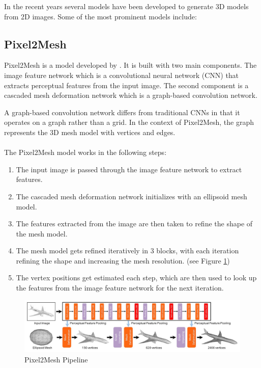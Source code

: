 In the recent years several models have been developed to generate 3D models from 2D images. Some of the most prominent models include:

\subsection{Pixel2Mesh}
Pixel2Mesh is a model developed by \textcite{wang_pixel2mesh_2018}.
It is built with two main components. The image feature network which is a convolutional neural network (CNN) that extracts perceptual features from the input image. The second component is a cascaded mesh deformation network which is a graph-based convolution network.

A graph-based convolution network differs from traditional CNNs in that it operates on a graph rather than a grid. In the context of Pixel2Mesh, the graph represents the 3D mesh model with vertices and edges.

\paragraph{}
The Pixel2Mesh model works in the following steps:
\begin{enumerate}
    \item The input image is passed through the image feature network to extract features.
    \item The cascaded mesh deformation network initializes with an ellipsoid mesh model.
    \item The features extracted from the image are then taken to refine the shape of the mesh model.
    \item The mesh model gets refined iteratively in 3 blocks, with each iteration refining the shape and increasing the mesh resolution. (see Figure \ref{fig:pixel2mesh})
    \item The vertex positions get estimated each step, which are then used to look up the features from the image feature network for the next iteration.
\end{enumerate}
\begin{figure}
    \centering
    \includegraphics[width=1\linewidth]{images/pixel2mesh.jpg}
    \caption{Pixel2Mesh Pipeline \autocite{wang_pixel2mesh_2018}}
    \label{fig:pixel2mesh}
\end{figure}

